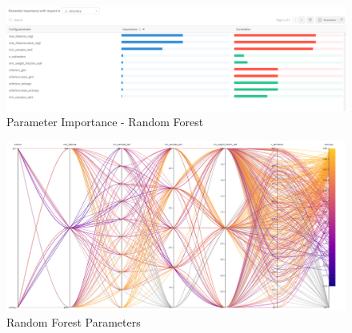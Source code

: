 \documentclass[11pt]{article}
\begin{document}
\begin{appendices}
\newpage
\begin{figure}
    \caption {Parameter Importance - Random Forest} \label{ParamImportanceRF}
    \centering
    \includegraphics[width = \textwidth, height = \textwidth, keepaspectratio]{Images/RF Parameter Importance.PNG}
\end{figure}

\newpage
\begin{figure}
    \caption {Random Forest Parameters} \label{ParallelCoordRF}
    \centering
    \includegraphics[width = \textwidth, height = \textwidth, keepaspectratio]{Images/RF ParallelCoordGraph.png}
\end{figure}




\end{appendices}
\end{document}
